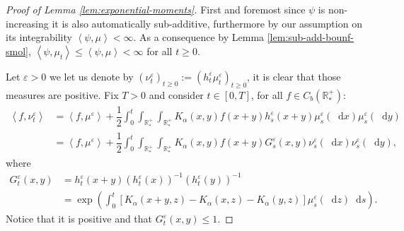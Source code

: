 \documentclass[11pt,a4paper]{article}
\newcommand{\RRP}{\mathbb{R}^+_*}
\newcommand{\Proc}[1]{\left(#1\right)_{t\geq 0}}
\newcommand{\brac}[1]{\left\langle#1\right\rangle}
\newcommand{\dd}{\mathop{}\!\mathrm{d}}
\begin{document}
\begin{proof}[Proof of Lemma \ref{lem:exponential-moments}]
    First and foremost since $\psi$ is non-increasing it is also automatically sub-additive, furthermore by our assumption on its integrability $\brac{\psi,\mu} < \infty$. As a consequence by Lemma \ref{lem:sub-add-bounf-smol}, $\brac{\psi,\mu_t}\leq \brac{\psi,\mu} < \infty$ for all $t \geq 0$.

    Let $\varepsilon > 0$ we let us denote by $\Proc{\nu_t^\varepsilon} := \Proc{h_t^\varepsilon\mu_t^\varepsilon}$, it is clear that those measures are positive. Fix $T > 0$ and consider $t \in [0,T]$, for all $f \in C_b(\RRP)$:
    \begin{align*}
        \brac{f,\nu_t^\varepsilon} &= \brac{f,\mu^\varepsilon} + \dfrac12\int_0^t \int_{\RRP}\int_{\RRP}K_\alpha(x,y)f(x+y)h_s^\varepsilon(x+y) \mu_s^\varepsilon(\dd x) \mu_s^\varepsilon(\dd y) \\
        &= \brac{f,\mu^\varepsilon} + \dfrac12\int_0^t \int_{\RRP}\int_{\RRP}K_\alpha(x,y)f(x+y)G_s^\varepsilon(x,y) \nu_s^\varepsilon(\dd x) \nu_s^\varepsilon(\dd y),
    \end{align*}
    where
    \begin{align*}
        G_t^\varepsilon(x,y) &= h_t^\varepsilon(x+y)\left(h_t^\varepsilon(x)\right)^{-1}\left(h_t^\varepsilon(y)\right)^{-1} \\
        &= \exp{\left(\int_0^t \left[K_\alpha(x+y,z) - K_\alpha(x,z) - K_\alpha(y,z)\right]\mu^\varepsilon_s(\dd z) \dd s \right)}.
    \end{align*}
    Notice that it is positive and that $G_t^\varepsilon(x,y) \leq 1$.
    

\end{proof}
\end{document}
